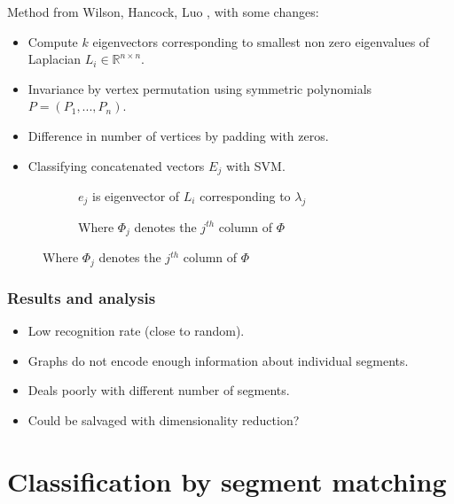 \documentclass{beamer}
\begin{document}
\begin{frame}
Method from Wilson, Hancock, Luo \cite{wilson2005pattern}, with some changes:
\begin{itemize}
\item Compute $k$ eigenvectors corresponding to smallest non zero eigenvalues of Laplacian $L_i \in \mathbb{R}^{n \times n}$.
\item Invariance by vertex permutation using symmetric polynomials $P = (P_1, ..., P_n)$.
\item Difference in number of vertices by padding with zeros.
\item Classifying concatenated vectors $E_j$ with SVM.
\end{itemize}

\begin{figure}
\begin{subfigure}{0.49\textwidth}
\caption{$e_j$ is eigenvector of $L_i$ corresponding to $\lambda_j$}
\end{subfigure}
\begin{subfigure}{0.49\textwidth}
\caption{Where $\Phi_j$ denotes the $j^{th}$ column of $\Phi$}
\end{subfigure}
\end{figure}

\end{frame}

\begin{frame}
\frametitle{Results and analysis}
\begin{itemize}
\item Low recognition rate (close to random).
\item Graphs do not encode enough information about individual segments.
\item Deals poorly with different number of segments.
\item Could be salvaged with dimensionality reduction?
\end{itemize}
\end{frame}

\section{Classification by segment matching}
\end{document}
